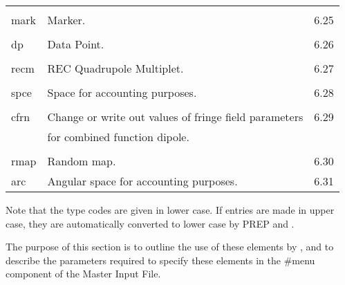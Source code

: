 \begin{center}
\begin{tabular}{lll}
\vspace{-3mm}& &\\
\hspace{1.5em}mark    &         Marker.                              &  \hspace{2em}6.25\\
\vspace{-3mm}& &\\
\hspace{1.5em}dp      &         Data Point.                          &  \hspace{2em}6.26\\
\vspace{-3mm}& &\\
\hspace{1.5em}recm    &         REC Quadrupole Multiplet.              & \hspace{2em}6.27\\
\vspace{-3mm}& &\\
\hspace{1.5em}spce    &         Space for accounting purposes.       & \hspace{2em}6.28\\
\vspace{-3mm}& &\\
\hspace{1.5em}cfrn    & Change or write out values of fringe field parameters& \hspace{2em}6.29\\
                      & for combined function dipole.                    &      \\
\vspace{-3mm}& &\\
\hspace{1.5em}rmap    &         Random map.       & \hspace{2em}6.30\\
\hspace{1.5em}arc    &  Angular space for accounting purposes.   & \hspace{2em}6.31
\end{tabular}
\end{center}
Note that the type codes are given in lower case.  If entries are made in
upper case, they are automatically converted to lower case by PREP and
\Maryend.

     The purpose of this section is to outline the use of these elements by
\Maryend, and to describe the parameters required to specify these elements
in the \#menu component of the Master Input File.

